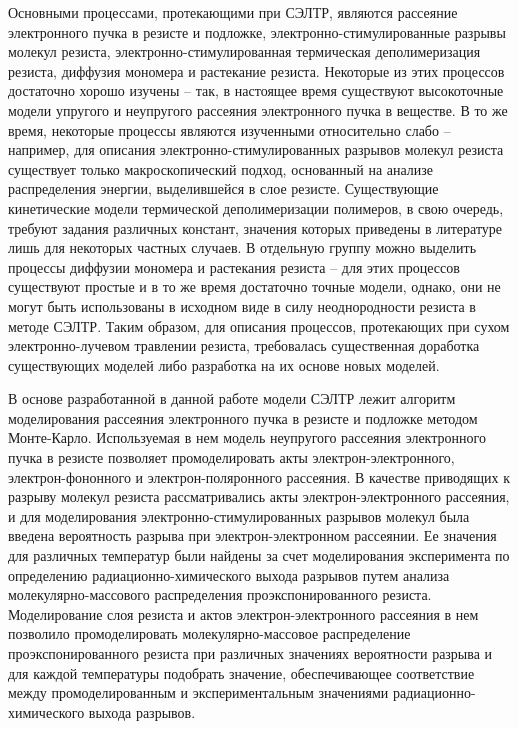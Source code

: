 Основными процессами, протекающими при СЭЛТР, являются рассеяние электронного пучка в резисте и подложке, электронно-стимулированные разрывы молекул резиста, электронно-стимулированная термическая деполимеризация резиста, диффузия мономера и растекание резиста.
Некоторые из этих процессов достаточно хорошо изучены -- так, в настоящее время существуют высокоточные модели упругого и неупругого рассеяния электронного пучка в веществе.
В то же время, некоторые процессы являются изученными относительно слабо -- например, для описания электронно-стимулированных разрывов молекул резиста существует только макроскопический подход, основанный на анализе распределения энергии, выделившейся в слое резисте.
Существующие кинетические модели термической деполимеризации полимеров, в свою очередь, требуют задания различных констант, значения которых приведены в литературе лишь для некоторых частных случаев.
В отдельную группу можно выделить процессы диффузии мономера и растекания резиста -- для этих процессов существуют простые и в то же время достаточно точные модели, однако, они не могут быть использованы в исходном виде в силу неоднородности резиста в методе СЭЛТР.
Таким образом, для описания процессов, протекающих при сухом электронно-лучевом травлении резиста, требовалась существенная доработка существующих моделей либо разработка на их основе новых моделей.

В основе разработанной в данной работе модели СЭЛТР лежит алгоритм моделирования рассеяния электронного пучка в резисте и подложке методом Монте-Карло.
Используемая в нем модель неупругого рассеяния электронного пучка в резисте позволяет промоделировать акты электрон-электронного, электрон-фононного и электрон-поляронного рассеяния.
В качестве приводящих к разрыву молекул резиста рассматривались акты электрон-электронного рассеяния, и для моделирования электронно-стимулированных разрывов молекул была введена вероятность разрыва при электрон-электронном рассеянии.
Ее значения для различных температур были найдены за счет моделирования эксперимента по определению радиационно-химического выхода разрывов путем анализа молекулярно-массового распределения проэкспонированного резиста.
Моделирование слоя резиста и актов электрон-электронного рассеяния в нем позволило промоделировать молекулярно-массовое распределение проэкспонированного резиста при различных значениях вероятности разрыва и для каждой температуры подобрать значение, обеспечивающее соответствие между промоделированным и экспериментальным значениями радиационно-химического выхода разрывов.

